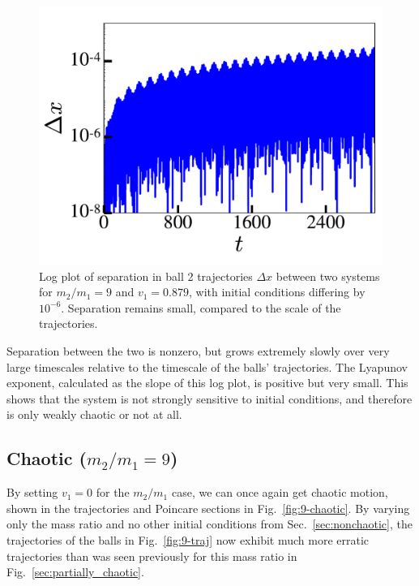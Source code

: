 \documentclass[pra,twocolumn,showpacs,amsmath,amssymb, aps, 10pt]{revtex4-1}
\begin{document}
\begin{figure}
  \includegraphics[width=0.8\linewidth]{nonchaotic_r0_1_lyapunov}
  \caption{Log plot of separation in ball 2 trajectories $\Delta x$
   between two systems for $m_2/m_1 = 9$ and $v_1=0.879$, with
  initial conditions differing by $10^{-6}$. Separation remains small, compared
  to the scale of the trajectories.}
  \label{fig:9-lyapunov-nonchaotic}
\end{figure}

Separation between the two is
nonzero, but grows extremely slowly over very large timescales relative to the
timescale of the balls' trajectories. The Lyapunov exponent, calculated as the slope
of this log plot, is positive but very small. This shows that the system is not
strongly sensitive to initial conditions, and therefore is only weakly chaotic
or not at all.





\subsection{Chaotic ($m_2/m_1 = 9$)}\label{sec:chaotic-9}

By setting
$v_1=0$ for the $m_2/m_1$ case, we can
once again get chaotic motion, shown in the trajectories and Poincare sections
in Fig.~\ref{fig:9-chaotic}.
By varying only the mass ratio and no other initial conditions from
Sec.~\ref{sec:nonchaotic}, the trajectories of the balls in Fig.~\ref{fig:9-traj}
now exhibit much more erratic trajectories than was seen previously for this
mass ratio in Fig.~\ref{sec:partially_chaotic}.
\end{document}
